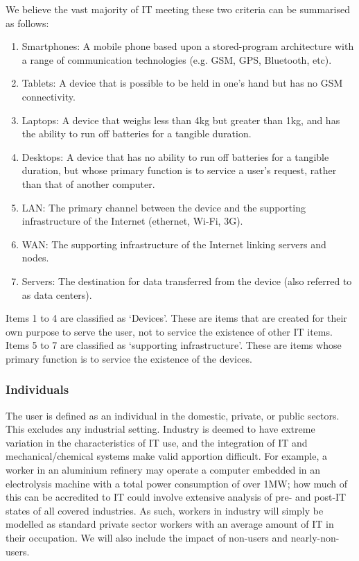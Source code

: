 \documentclass[conference]{IEEEtran}
\begin{document}
We believe the vast majority of IT meeting these two criteria can be
summarised as follows:

\begin{enumerate}
\item Smartphones: A mobile phone based upon a stored-program
  architecture with a range of communication technologies (e.g. GSM, GPS,
  Bluetooth, etc).
\item Tablets: A device that is possible to be held in one’s hand but
  has no GSM connectivity.
\item Laptops: A device that weighs less than 4kg but greater
  than 1kg, and has the ability to run off batteries for a
  tangible duration.
\item Desktops: A device that has no ability to run off batteries for
  a tangible duration, but whose primary function is to service a
  user’s request, rather than that of another computer.
\item LAN: The primary channel between the device and the supporting
  infrastructure of the Internet (ethernet, Wi-Fi, 3G).
\item WAN: The supporting infrastructure of the Internet linking
  servers and nodes.
\item Servers: The destination for data transferred from the device
  (also referred to as data centers).
\end{enumerate}

Items 1 to 4 are classified as `Devices'. These are items that are
created for their own purpose to serve the user, not to service the
existence of other IT items. Items 5 to 7 are classified as
`supporting infrastructure'. These are items whose primary function is
to service the existence of the devices.

\subsubsection{Individuals}

The user is defined as an individual in the domestic, private, or
public sectors. This excludes any industrial setting. Industry is
deemed to have extreme variation in the characteristics of IT use, and
the integration of IT and mechanical/chemical systems make valid
apportion difficult. For example, a worker in an aluminium refinery
may operate a computer embedded in an electrolysis machine with a
total power consumption of over 1MW; how much of this can be
accredited to IT could involve extensive analysis of pre- and post-IT
states of all covered industries. As such, workers in industry will
simply be modelled as standard private sector workers with an average
amount of IT in their occupation. We will also include the impact of
non-users and nearly-non-users.
\end{document}
